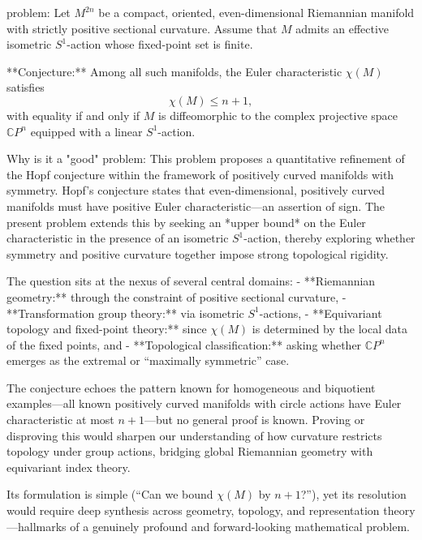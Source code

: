 problem:  
Let \( M^{2n} \) be a compact, oriented, even-dimensional Riemannian manifold with strictly positive sectional curvature. Assume that \( M \) admits an effective isometric \( S^1 \)-action whose fixed-point set is finite.  

**Conjecture:** Among all such manifolds, the Euler characteristic \( \chi(M) \) satisfies  
\[
\chi(M) \leq n+1,
\]
with equality if and only if \( M \) is diffeomorphic to the complex projective space \( \mathbb{C}P^n \) equipped with a linear \( S^1 \)-action.  

Why is it a "good" problem:  
This problem proposes a quantitative refinement of the Hopf conjecture within the framework of positively curved manifolds with symmetry. Hopf’s conjecture states that even-dimensional, positively curved manifolds must have positive Euler characteristic—an assertion of sign. The present problem extends this by seeking an *upper bound* on the Euler characteristic in the presence of an isometric \( S^1 \)-action, thereby exploring whether symmetry and positive curvature together impose strong topological rigidity.  

The question sits at the nexus of several central domains:  
- **Riemannian geometry:** through the constraint of positive sectional curvature,  
- **Transformation group theory:** via isometric \( S^1 \)-actions,  
- **Equivariant topology and fixed-point theory:** since \( \chi(M) \) is determined by the local data of the fixed points, and  
- **Topological classification:** asking whether \( \mathbb{C}P^n \) emerges as the extremal or “maximally symmetric” case.  

The conjecture echoes the pattern known for homogeneous and biquotient examples—all known positively curved manifolds with circle actions have Euler characteristic at most \( n+1 \)—but no general proof is known. Proving or disproving this would sharpen our understanding of how curvature restricts topology under group actions, bridging global Riemannian geometry with equivariant index theory.  

Its formulation is simple (“Can we bound \( \chi(M) \) by \( n+1 \)?”), yet its resolution would require deep synthesis across geometry, topology, and representation theory—hallmarks of a genuinely profound and forward-looking mathematical problem.